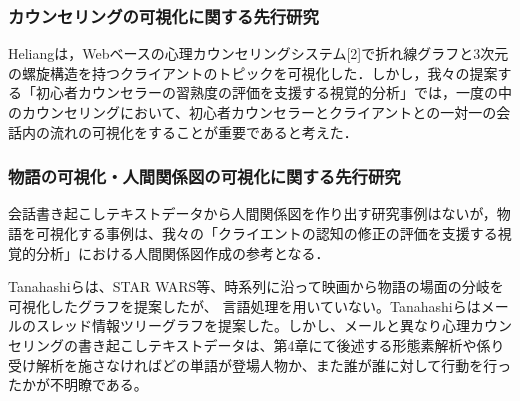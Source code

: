 \documentclass[shuuron]{kuee}
\begin{document}





\subsubsection{カウンセリングの可視化に関する先行研究}%

Heliang\cite{shou}は，Webベースの心理カウンセリングシステム[2]で折れ線グラフと3次元の螺旋構造を持つクライアントのトピックを可視化した．しかし，我々の提案する「初心者カウンセラーの習熟度の評価を支援する視覚的分析」では，一度の中のカウンセリングにおいて、初心者カウンセラーとクライアントとの一対一の会話内の流れの可視化をすることが重要であると考えた．

\subsubsection{物語の可視化・人間関係図の可視化に関する先行研究}%

会話書き起こしテキストデータから人間関係図を作り出す研究事例はないが，物語を可視化する事例は、我々の「クライエントの認知の修正の評価を支援する視覚的分析」における人間関係図作成の参考となる．

Tanahashiら\cite{tanahashi2012design}は、STAR WARS等、時系列に沿って映画から物語の場面の分岐を可視化したグラフを提案したが、
言語処理を用いていない。Tanahashiら\cite{tanahashi2015efficient}はメールのスレッド情報ツリーグラフを提案した。しかし、メールと異なり心理カウンセリングの書き起こしテキストデータは、第4章にて後述する形態素解析や係り受け解析を施さなければどの単語が登場人物か、また誰が誰に対して行動を行ったかが不明瞭である。
\end{document}
